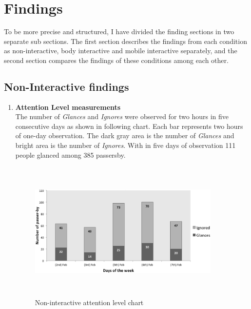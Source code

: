 \section{Findings}
To be more precise and structured, I have divided the finding sections in two separate sub sections. The first section describes the findings from each condition as non-interactive, body interactive and mobile interactive separately, and the second section compares the findings of these conditions among each other.


\subsection{Non-Interactive findings}

\begin{enumerate}

\item \textbf{Attention Level measurements} \\
The number of \emph{Glances} and \emph{Ignores} were observed for two hours in five consecutive days as shown in following chart. Each bar represents two hours of one-day observation. The dark gray area is the number of \emph{Glances} and bright area is the number of \emph{Ignores}. With in five days of observation 111 people glanced among 385 passersby. 

\begin{figure}[H]
    \centering
    \includegraphics[width=0.9\textwidth,height=7cm]{Figures/8/non_inter_findings/Non_Inter_chart}%
    \caption{Non-interactive attention level chart}%
    \label{fig:Nonattentionlevelchart}%
\end{figure}



\end{enumerate}

